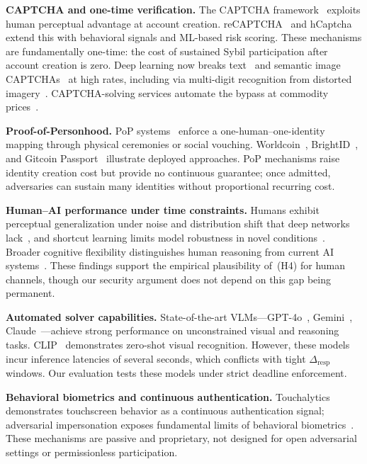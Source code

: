 \documentclass[11pt]{article}
\theoremstyle{remark}
\theoremstyle{plain}
\begin{document}
	\noindent\textbf{CAPTCHA and one-time verification.}
	The CAPTCHA framework~\cite{vonahn2003captcha} exploits human
	perceptual advantage at account creation. reCAPTCHA~\cite{recaptcha2019}
	and hCaptcha~\cite{hcaptcha2020} extend this with behavioral signals and
	ML-based risk scoring. These mechanisms are fundamentally one-time: the
	cost of sustained Sybil participation after account creation is zero.
	Deep learning now breaks text~\cite{bursztein2011text,ye2018yet} and
	semantic image CAPTCHAs~\cite{sivakorn2016iam} at high rates, including
	via multi-digit recognition from distorted
	imagery~\cite{goodfellow2014multidigit}. CAPTCHA-solving services
	automate the bypass at commodity prices~\cite{motoyama2010recaptchas}.
	
	\noindent\textbf{Proof-of-Personhood.}
	PoP systems~\cite{borge2017proofofpersonhood,ford2020pseudonym} enforce
	a one-human--one-identity mapping through physical ceremonies or social
	vouching. Worldcoin~\cite{worldcoin2023}, BrightID~\cite{brightid2022},
	and Gitcoin Passport~\cite{gitcoin2023} illustrate deployed approaches.
	PoP mechanisms raise identity creation cost but provide no continuous
	guarantee; once admitted, adversaries can sustain many identities
	without proportional recurring cost.
	
	\noindent\textbf{Human--AI performance under time constraints.}
	Humans exhibit perceptual generalization under noise and distribution
	shift that deep networks lack~\cite{geirhos2018generalisation,geirhos2019texture},
	and shortcut learning limits model robustness in novel
	conditions~\cite{geirhos2020shortcut}. Broader cognitive flexibility
	distinguishes human reasoning from current AI
	systems~\cite{lake2017building}. These findings support the empirical
	plausibility of~(H4) for human channels, though our security argument
	does not depend on this gap being permanent.
	
	\noindent\textbf{Automated solver capabilities.}
	State-of-the-art VLMs---GPT-4o~\cite{openai2023gpt4},
	Gemini~\cite{geminiteam2023}, Claude~\cite{anthropic2024claude}---achieve
	strong performance on unconstrained visual and reasoning tasks.
	CLIP~\cite{radford2021clip} demonstrates zero-shot visual recognition.
	However, these models incur inference latencies of several seconds,
	which conflicts with tight $\Delta_{\mathrm{resp}}$ windows. Our
	evaluation tests these models under strict deadline enforcement.
	
	\noindent\textbf{Behavioral biometrics and continuous authentication.}
	Touchalytics~\cite{frank2013touchalytics} demonstrates touchscreen
	behavior as a continuous authentication signal; adversarial impersonation
	exposes fundamental limits of behavioral
	biometrics~\cite{serwadda2013kids}. These mechanisms are passive and
	proprietary, not designed for open adversarial settings or
	permissionless participation.
	
\end{document}
